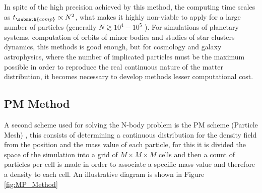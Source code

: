 In spite of the high precision achieved by this method, the computing time
scales as $t_{\submath{comp}}\propto N^2$, what makes it highly non-viable
to apply for a large number of particles (generally $N\gtrsim 10^4-10^5$ 
\cite{padmanabhan1995}). For simulations of planetary systems, computation
of orbits of minor bodies and studies of star clusters dynamics, this 
methods is good enough, but for cosmology and galaxy astrophysics, where 
the number of implicated particles must be the maximum possible in order 
to reproduce the real continuous nature of the matter distribution, it 
becomes necessary to develop methods lesser computational 
cost.



	\subsection{PM Method}
	\label{subsec:PMMethod}
	
	
A second scheme used for solving the N-body problem is the PM scheme 
(Particle Mesh) \cite{dawson1983}, this consists of determining a 
continuous distribution for the density field from the position and the
mass value of each particle, for this it is divided the space of the 
simulation into a grid of $M\times M\times M$ cells and then a count of
particles per cell is made in order to associate a specific mass value and
therefore a density to each cell. An illustrative diagram is shown in 
Figure \ref{fig:MP_Method}


